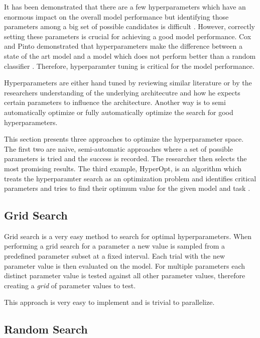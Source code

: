 It has been demonstrated that there are a few hyperparameters which have an enormous impact on the overall model performance but identifying those parameters among a big set of possible candidates is difficult \cite{Bergstra2012a}. However, correctly setting these parameters is crucial for achieving a good model performance. Cox and Pinto demonstrated that hyperparameters make the difference between a state of the art model and a model which does not perform better than a random classifier \cite{Cox2011}. Therefore, hyperparamter tuning is critical for the model performance.

Hyperparameters are either hand tuned by reviewing similar literature or by the researchers understanding of the underlying architecutre and how he expects certain parameters to influence the architecture. Another way is to semi automatically optimize or fully automatically optimize the search for good hyperparameters.

This section presents three approaches to optimize the hyperparameter space. The first two are naive, semi-automatic approaches where a set of possible parameters is tried and the success is recorded. The researcher then selects the most promising results. The third example, HyperOpt, is an algorithm which treats the hyperparamter search as an optimization problem and identifies critical parameters and tries to find their optimum value for the given model and task \cite{Bergstra2013}.



\subsection{Grid Search}

Grid search is a very easy method to search for optimal hyperparameters. When performing a grid search for a parameter a new value is sampled from a predefined parameter subset at a fixed interval. Each trial with the new parameter value is then evaluated on the model. For multiple parameters each distinct parameter value is tested against all other parameter values, therefore creating a \textit{grid} of parameter values to test.

This approach is very easy to implement and is trivial to parallelize.

\subsection{Random Search}

